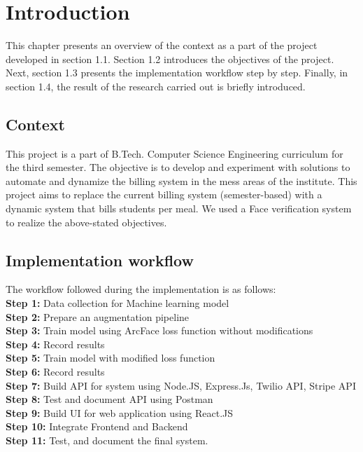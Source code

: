 \chapter{Introduction}
\label{introchap}

This chapter presents an overview of the context as a part of the project developed in
section 1.1. Section 1.2 introduces the objectives of the project. Next, section 1.3 presents the implementation workflow step by step. Finally, in section 1.4, the result of the research carried out is briefly introduced.

\section{Context}
This project is a part of B.Tech. Computer Science Engineering curriculum for the third
semester. The objective is to develop and experiment with solutions to automate and dynamize
the billing system in the mess areas of the institute. This project aims to replace the current billing
system (semester-based) with a dynamic system that bills students per meal. We used a Face verification system to realize the above-stated objectives.

\section{Implementation workflow}
The workflow followed during the implementation is as follows:\\
\textbf{Step 1:} Data collection for Machine learning model\\
\textbf{Step 2:} Prepare an augmentation pipeline\\
\textbf{Step 3:} Train model using ArcFace loss function without modifications\\
\textbf{Step 4:} Record results\\
\textbf{Step 5:} Train model with modified loss function\\
\textbf{Step 6:} Record results\\
\textbf{Step 7:} Build API for system using Node.JS, Express.Js, Twilio API, Stripe API\\
\textbf{Step 8:} Test and document API using Postman\\
\textbf{Step 9:} Build UI for web application using React.JS\\
\textbf{Step 10:} Integrate Frontend and Backend\\
\textbf{Step 11:} Test, and document the final system.

